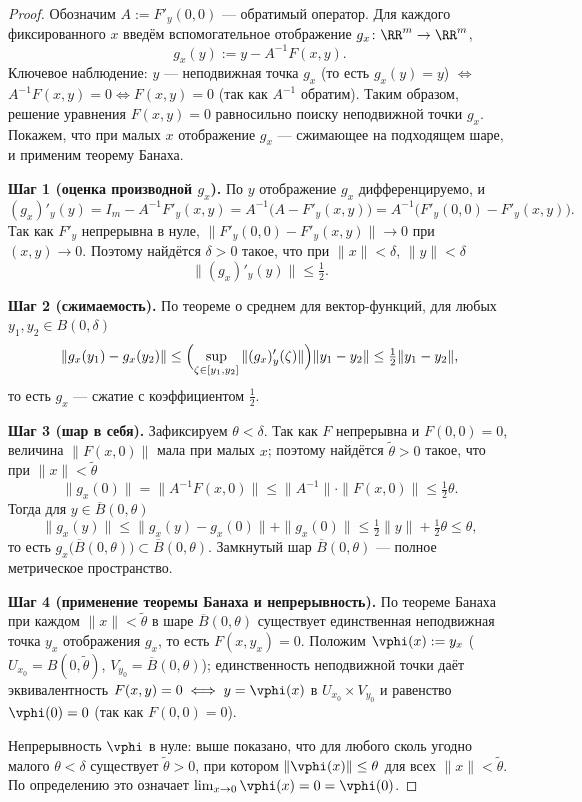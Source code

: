 \begin{proof}
	Обозначим $A:=F'_y(0,0)$ --- обратимый оператор. Для каждого фиксированного $x$
	введём вспомогательное отображение $g_x\colon\RR^m\to\RR^m$,
	\[
	g_x(y):=y-A^{-1}F(x,y).
	\]
	Ключевое наблюдение: $y$ --- неподвижная точка $g_x$ (то есть $g_x(y)=y$) $\iff$
	$A^{-1}F(x,y)=0\iff F(x,y)=0$ (так как $A^{-1}$ обратим). Таким образом, решение
	уравнения $F(x,y)=0$ равносильно поиску неподвижной точки $g_x$. Покажем, что при
	малых $x$ отображение $g_x$ --- сжимающее на подходящем шаре, и применим теорему
	Банаха.

	\textbf{Шаг 1 (оценка производной $g_x$).} По $y$ отображение $g_x$
	дифференцируемо, и
	\[
	(g_x)'_y(y)=I_m-A^{-1}F'_y(x,y)=A^{-1}\bigl(A-F'_y(x,y)\bigr)
	=A^{-1}\bigl(F'_y(0,0)-F'_y(x,y)\bigr).
	\]
	Так как $F'_y$ непрерывна в нуле, $\|F'_y(0,0)-F'_y(x,y)\|\to 0$ при $(x,y)\to 0$.
	Поэтому найдётся $\delta>0$ такое, что при $\|x\|<\delta$, $\|y\|<\delta$
	\[
	\|(g_x)'_y(y)\|\le\tfrac12.
	\]

	\textbf{Шаг 2 (сжимаемость).} По теореме о среднем для вектор-функций, для любых
	$y_1,y_2\in B(0,\delta)$
	\[
	\|g_x(y_1)-g_x(y_2)\|
	\le\Bigl(\sup_{\zeta\in[y_1,y_2]}\|(g_x)'_y(\zeta)\|\Bigr)\|y_1-y_2\|
	\le\tfrac12\|y_1-y_2\|,
	\]
	то есть $g_x$ --- сжатие с коэффициентом $\tfrac12$.

	\textbf{Шаг 3 (шар в себя).} Зафиксируем $\theta<\delta$. Так как $F$ непрерывна и
	$F(0,0)=0$, величина $\|F(x,0)\|$ мала при малых $x$; поэтому найдётся
	$\tilde\theta>0$ такое, что при $\|x\|<\tilde\theta$
	\[
	\|g_x(0)\|=\|A^{-1}F(x,0)\|\le\|A^{-1}\|\cdot\|F(x,0)\|\le\tfrac12\theta.
	\]
	Тогда для $y\in\overline{B}(0,\theta)$
	\[
	\|g_x(y)\|\le\|g_x(y)-g_x(0)\|+\|g_x(0)\|\le\tfrac12\|y\|+\tfrac12\theta\le\theta,
	\]
	то есть $g_x\bigl(\overline{B}(0,\theta)\bigr)\subset\overline{B}(0,\theta)$.
	Замкнутый шар $\overline{B}(0,\theta)$ --- полное метрическое пространство.

	\textbf{Шаг 4 (применение теоремы Банаха и непрерывность).} По теореме Банаха при
	каждом $\|x\|<\tilde\theta$ в шаре $\overline{B}(0,\theta)$ существует единственная
	неподвижная точка $y_x$ отображения $g_x$, то есть $F(x,y_x)=0$. Положим
	$\vphi(x):=y_x$ ($U_{x_0}=B(0,\tilde\theta)$, $V_{y_0}=\overline{B}(0,\theta)$);
	единственность неподвижной точки даёт эквивалентность $F(x,y)=0\iff y=\vphi(x)$ в
	$U_{x_0}\times V_{y_0}$ и равенство $\vphi(0)=0$ (так как $F(0,0)=0$).

	Непрерывность $\vphi$ в нуле: выше показано, что для любого сколь угодно малого
	$\theta<\delta$ существует $\tilde\theta>0$, при котором $\|\vphi(x)\|\le\theta$
	для всех $\|x\|<\tilde\theta$. По определению это означает
	$\lim_{x\to 0}\vphi(x)=0=\vphi(0)$.
\end{proof}

